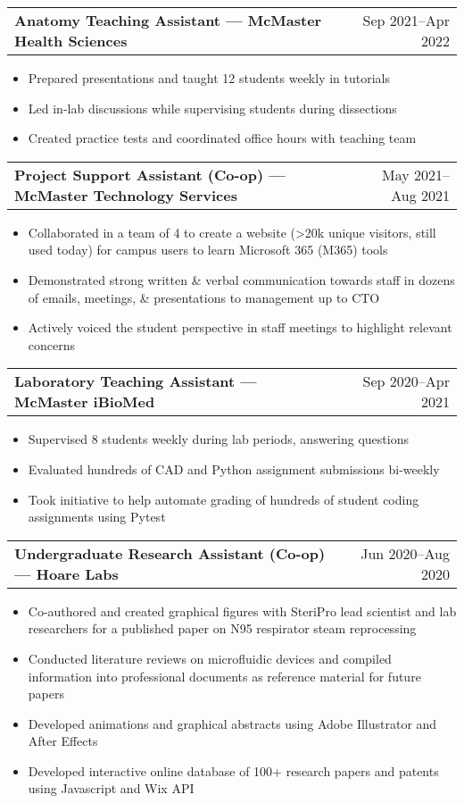 \documentclass[a4paper,12pt]{article}
\makeatletter
\newenvironment{joblong}[2]
    {
    \begin{tabularx}{\linewidth}{@{}l X r@{}}
    \textbf{#1} & \hfill &  #2 \\[3.75pt]
    \end{tabularx}
    \begin{minipage}[t]{\linewidth}
    \begin{itemize}[nosep,after=\strut, leftmargin=1em, itemsep=3pt,label=--]
    }
    {
    \end{itemize}
    \end{minipage}    
    }
\makeatother
\begin{document}
\begin{joblong}{Anatomy Teaching Assistant — McMaster Health Sciences}{Sep 2021--Apr 2022}
\item Prepared presentations and taught 12 students weekly in tutorials
\item Led in-lab discussions while supervising students during dissections
\item Created practice tests and coordinated office hours with teaching team
\end{joblong}

\begin{joblong}{Project Support Assistant (Co-op) — McMaster Technology Services}{May 2021--Aug 2021}
\item Collaborated in a team of 4 to create a website (>20k unique visitors, still used today) for campus users to learn Microsoft 365 (M365) tools
\item Demonstrated strong written \& verbal communication towards staff in dozens of emails, meetings, \& presentations to management up to CTO
\item Actively voiced the student perspective in staff meetings to highlight relevant concerns
\end{joblong}

\begin{joblong}{Laboratory Teaching Assistant — McMaster iBioMed}{Sep 2020--Apr 2021}
\item Supervised 8 students weekly during lab periods, answering questions
\item Evaluated hundreds of CAD and Python assignment submissions bi-weekly
\item Took initiative to help automate grading of hundreds of student coding assignments using Pytest
\end{joblong}

\begin{joblong}{Undergraduate Research Assistant (Co-op) — Hoare Labs}{Jun 2020--Aug 2020}
\item Co-authored and created graphical figures with SteriPro lead scientist and lab researchers for a published paper on N95 respirator steam reprocessing
\item Conducted literature reviews on microfluidic devices and compiled information into professional documents as reference material for future papers
\item Developed animations and graphical abstracts using Adobe Illustrator and After Effects
\item Developed interactive online database of 100+ research papers and patents using Javascript and Wix API
\end{joblong}
\end{document}
